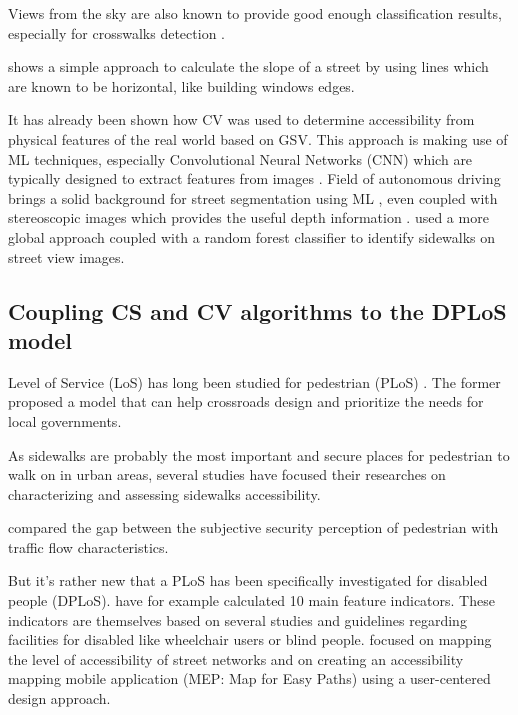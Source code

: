 \documentclass[10pt,conference,a4paper]{IEEEtran}
\begin{document}
Views from the sky are also known to provide good enough classification results, especially for crosswalks detection \cite{berriel_deep_2017}.

\cite{lu_real-time_2015} shows a simple approach to calculate the slope of a street by using lines which are known to be horizontal, like building windows edges.

It has already been shown \cite{hara_tohme:_2014, hara_design_2016} how CV was used to determine accessibility from physical features of the real world based on GSV. This approach is making use of ML techniques, especially Convolutional Neural Networks (CNN) which are typically designed to extract features from images \cite{lecun1995convolutional}. Field of autonomous driving brings a solid background for street segmentation using ML \cite{alvarez2012road}, even coupled with stereoscopic images which provides the useful depth information \cite{coughlan_terrain_2007,ivanchenko_computer_2008,zbontar2016stereo}.
\cite{smith_classification_2013} used a more global approach coupled with a random forest classifier to identify sidewalks on street view images.





\subsection{Coupling CS and CV algorithms to the DPLoS model}
Level of Service (LoS) has long been studied for pedestrian (PLoS) \cite{landis_modeling_2001,dixon_bicycle_1996, gallin_quantifying_2001}. The former proposed a model that can help crossroads design and prioritize the needs for local governments. 

As sidewalks are probably the most important and secure places for pedestrian to walk on in urban areas, several studies have focused their researches on characterizing and assessing sidewalks accessibility.

\cite{tan_research_2007} compared the gap between the subjective security perception of pedestrian with traffic flow characteristics.

But it's rather new that a PLoS has been specifically investigated for disabled people (DPLoS). \cite{asadi-shekari_zohreh_disabled_2013, asadi-shekari_pedestrian_2014} have for example calculated 10 main feature indicators. These indicators are themselves based on several studies and guidelines regarding facilities for disabled like wheelchair users or blind people. 
\cite{mostafavi2015mobilisig, gharebaghi2017confidence} focused on mapping the level of accessibility of street networks and \cite{liu_crowdsourcing-based_2017, comai_mapping_2015} on creating an accessibility mapping mobile application (MEP: Map for Easy Paths) using a user-centered design approach. 
\end{document}
